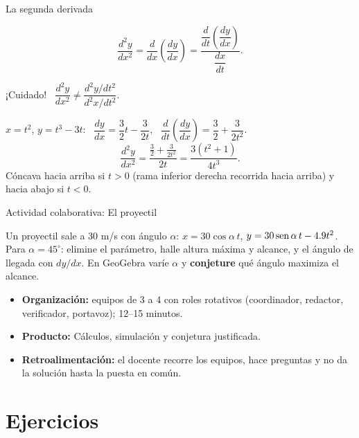 \documentclass[10pt,aspectratio=169]{beamer}
\begin{document}
\begin{frame}{La segunda derivada}
  \begin{teorema}
    \[ \frac{d^2y}{dx^2}=\frac{d}{dx}\left(\frac{dy}{dx}\right)=\frac{\dfrac{d}{dt}\left(\dfrac{dy}{dx}\right)}{\dfrac{dx}{dt}}. \]
  \end{teorema}
  \alert{¡Cuidado!} \ $\dfrac{d^2y}{dx^2}\neq\dfrac{d^2y/dt^2}{d^2x/dt^2}$.
  \begin{ejemplo}[9]
    $x=t^2$, $y=t^3-3t$: \ $\dfrac{dy}{dx}=\dfrac32t-\dfrac{3}{2t}$, \ $\dfrac{d}{dt}\left(\dfrac{dy}{dx}\right)=\dfrac32+\dfrac{3}{2t^2}$.
    \[ \frac{d^2y}{dx^2}=\frac{\frac32+\frac{3}{2t^2}}{2t}=\frac{3(t^2+1)}{4t^3}. \]
    Cóncava hacia arriba si $t>0$ (rama inferior derecha recorrida hacia arriba) y hacia abajo si $t<0$.
  \end{ejemplo}
\end{frame}

\begin{frame}{Actividad colaborativa: El proyectil}
  \small
  \begin{activa}
    Un proyectil sale a 30 m/s con ángulo $\alpha$: $x=30\cos\alpha\,t$, $y=30\operatorname{sen}\alpha\,t-4.9t^2$. Para $\alpha=45^\circ$: elimine el parámetro, halle altura máxima y alcance, y el ángulo de llegada con $dy/dx$. En GeoGebra varíe $\alpha$ y \textbf{conjeture} qué ángulo maximiza el alcance.
  \end{activa}
  \begin{itemize}
    \item \textbf{Organización:} equipos de 3 a 4 con roles rotativos (coordinador, redactor, verificador, portavoz); 12--15 minutos.
    \item \textbf{Producto:} Cálculos, simulación y conjetura justificada.
    \item \textbf{Retroalimentación:} el docente recorre los equipos, hace preguntas y no da la solución hasta la puesta en común.
  \end{itemize}
\end{frame}

\section{Ejercicios}
\end{document}
